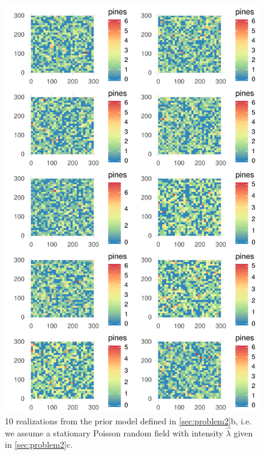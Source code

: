 \begin{figure}
    \centering
    \includegraphics{figures/p2_prior_sims.pdf}
    \caption{10 realizations from the prior model defined in \ref{sec:problem2}b, i.e. we assume a stationary Poisson random field with intensity $\hat{\lambda}$ given in \ref{sec:problem2}c.}
    \label{fig:p2_prior_sims}
\end{figure}

